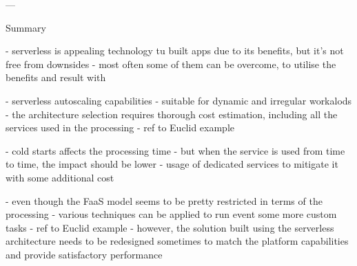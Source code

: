 


---

Summary

\label{chapter:serverless-suitability}
- serverless is appealing technology tu built apps due to its benefits, but it's not free from downsides - most often some of them can be overcome, to utilise the benefits and result with 

\label{chapter:serverless-suitability-utilisation-patterns}
- serverless autoscaling capabilities - suitable for dynamic and irregular workalods - the architecture selection requires thorough cost estimation, including all the services used in the processing - ref to Euclid example

\label{chapter:serverless-suitability-processing-time}
- cold starts affects the processing time - but when the service is used from time to time, the impact should be lower - usage of dedicated services to mitigate it with some additional cost

\label{chapter:serverless-processing-limitations-tunrime-and-data-restrictions}
- even though the FaaS model seems to be pretty restricted in terms of the processing - various techniques can be applied to run event some more custom tasks - ref to Euclid example
- however, the solution built using the serverless architecture needs to be redesigned sometimes to match the platform capabilities and provide satisfactory performance

